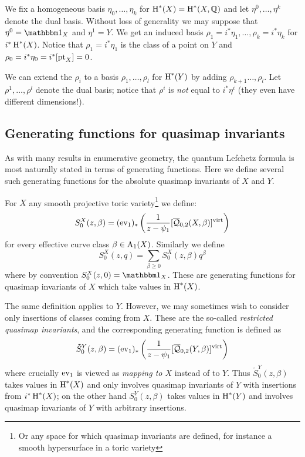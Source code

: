 We fix a homogeneous basis $\eta_0, \ldots, \eta_k$ for $\operatorname{H}^*(X) = \operatorname{H}^*(X,\mathbb{Q})$ and let $\eta^0, \ldots, \eta^k$ denote the dual basis. Without loss of generality we may suppose that $\eta^0=\mathbbm 1_X$ and $\eta^1=Y$. We get an induced basis $\rho_1=i^*\eta_1, \ldots, \rho_k = i^* \eta_k$ for $i^*\operatorname{H}^*(X)$. Notice that $\rho_1 = i^* \eta_1$ is the class of a point on $Y$ and $\rho_0 = i^* \eta_0 = i^* [\operatorname{pt}_X] = 0$.

We can extend the $\rho_i$ to a basis $\rho_1, \ldots, \rho_l$ for $\operatorname{H}^*(Y)$ by adding $\rho_{k+1}\ldots,\rho_{l}$. Let $\rho^1, \ldots, \rho^l$ denote the dual basis; notice that $\rho^i$ is \emph{not} equal to $i^* \eta^i$ (they even have different dimensions!).

\subsection{Generating functions for quasimap invariants}
As with many results in enumerative geometry, the quantum Lefchetz formula is most naturally stated in terms of generating functions. Here we define several such generating functions for the absolute quasimap invariants of $X$ and $Y$.

For $X$ any smooth projective toric variety\footnote{Or any space for which quasimap invariants are defined, for instance a smooth hypersurface in a toric variety} we define: 
\begin{equation*} S_0^X(z,\beta)=(\operatorname{ev}_1)_*\left(\frac{1}{z-\psi_1} [\overline{\mathcal Q}_{0,2}(X,\beta)]^{\operatorname{virt}}\right) \end{equation*}
for every effective curve class $\beta\in \operatorname{A}_1(X)$. Similarly we define
\begin{equation*} S_0^X(z,q)=\sum_{\beta\geq 0}S_0^X(z,\beta) q^\beta \end{equation*}
where by convention $S_0^X(z,0)= \mathbbm 1_X$. These are generating functions for quasimap invariants of $X$ which take values in $\operatorname{H}^*(X)$.

The same definition applies to $Y$. However, we may sometimes wish to consider only insertions of classes coming from $X$. These are the so-called \emph{restricted quasimap invariants}, and the corresponding generating function is defined as
\begin{equation*} \tilde{S}^Y_0(z,\beta) = (\operatorname{ev}_1)_* \left( \dfrac{1}{z-\psi_1} [\overline{\mathcal Q}_{0,2}(Y,\beta)]^{\operatorname{virt}} \right) \end{equation*}
where crucially $\operatorname{ev}_1$ is viewed as \emph{mapping to $X$} instead of to $Y$. Thus $\tilde{S}^Y_0(z,\beta)$ takes values in $\operatorname{H}^*(X)$ and only involves quasimap invariants of $Y$ with insertions from $i^*\operatorname{H}^*(X)$; on the other hand $S^Y_0(z,\beta)$ takes values in $\operatorname{H}^*(Y)$ and involves quasimap invariants of $Y$ with arbitrary insertions.


